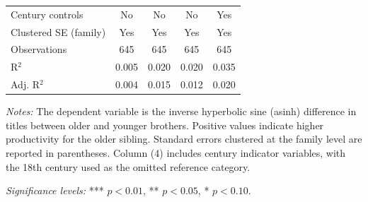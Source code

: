 \begin{table}[H]
\begin{tablebody}
\begin{tabular}{l c c c c}
\midrule
Century controls & No & No & No & Yes \\
Clustered SE (family) & Yes & Yes & Yes & Yes \\
\midrule
Observations & 645 & 645 & 645 & 645 \\
R$^{2}$ & 0.005 & 0.020 & 0.020 & 0.035 \\
Adj. R$^{2}$ & 0.004 & 0.015 & 0.012 & 0.020 \\
\bottomrule
\end{tabular}
\end{tablebody}

\vspace{4pt}
\begin{minipage}{\textwidth}
\footnotesize
\textit{Notes:} The dependent variable is the inverse hyperbolic sine (asinh) difference in titles between older and younger brothers. Positive values indicate higher productivity for the older sibling. Standard errors clustered at the family level are reported in parentheses. Column (4) includes century indicator variables, with the 18th century used as the omitted reference category.

\textit{Significance levels:} *** $p<0.01$, ** $p<0.05$, * $p<0.10$.
\end{minipage}

\end{table}